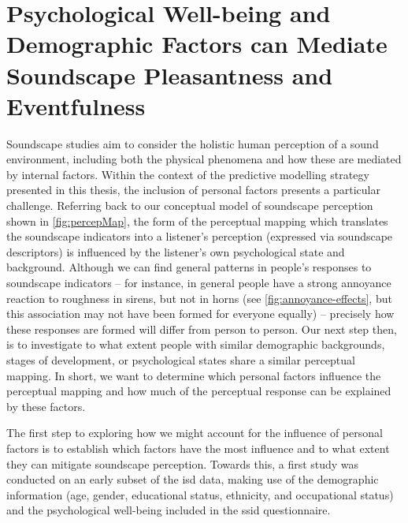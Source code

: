 \chapter{Psychological Well-being and Demographic Factors can Mediate Soundscape Pleasantness and Eventfulness}
\label{ch:whostudy}
Soundscape studies aim to consider the holistic human perception of a sound environment, including both the physical phenomena and how these are mediated by internal factors. Within the context of the predictive modelling strategy presented in this thesis, the inclusion of personal factors presents a particular challenge. Referring back to our conceptual model of soundscape perception shown in \cref{fig:percepMap}, the form of the perceptual mapping which translates the soundscape indicators into a listener's perception (expressed via soundscape descriptors) is influenced by the listener's own psychological state and background. Although we can find general patterns in people's responses to soundscape indicators -- for instance, in general people have a strong annoyance reaction to roughness in sirens, but not in horns (see \cref{fig:annoyance-effects}, but this association may not have been formed for everyone equally) -- precisely how these responses are formed will differ from person to person. Our next step then, is to investigate to what extent people with similar demographic backgrounds, stages of development, or psychological states share a similar perceptual mapping. In short, we want to determine which personal factors influence the perceptual mapping and how much of the perceptual response can be explained by these factors.

The first step to exploring how we might account for the influence of personal factors is to establish which factors have the most influence and to what extent they can mitigate soundscape perception. Towards this, a first study was conducted on an early subset of the \gls{isd} data, making use of the demographic information (age, gender, educational status, ethnicity, and occupational status) and the psychological well-being included in the \gls{ssid} questionnaire.


